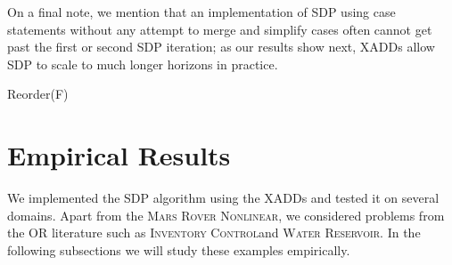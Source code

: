 \documentclass[letterpaper]{article}
\newcommand{\MarsRoverNL}{\textsc{Mars Rover Nonlinear}}
\newcommand{\InventoryControl}{\textsc{Inventory Control}}
\newcommand{\WaterReservoir}{\textsc{Water Reservoir}}
\begin{document}
On a final note, we mention that an implementation of SDP using case
statements without any attempt to merge and simplify cases often
cannot get past the first or second SDP iteration; as our results show
next, XADDs allow SDP to scale to much longer horizons in practice.

\incmargin{1em}
\begin{algorithm}[t!]

\BlankLine
{}
\caption{{\sc Reorder}(F)  \label{fig:correct}}
\end{algorithm}
\decmargin{1em}

\section{Empirical Results}


We implemented the SDP algorithm using the XADDs and tested it on several domains. Apart from the \MarsRoverNL,  we considered problems from the OR literature such as \InventoryControl  and \WaterReservoir. In the following subsections we will study these examples empirically.
\end{document}

